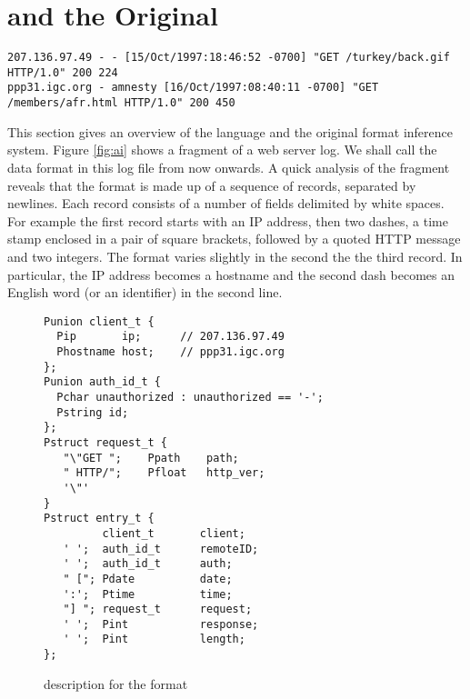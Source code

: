 \section{\pads{} and the Original \learnpads{}} 
\label{sec:review}

\begin{figure*}[th]
{\small \begin{verbatim}
207.136.97.49 - - [15/Oct/1997:18:46:52 -0700] "GET /turkey/back.gif HTTP/1.0" 200 224
ppp31.igc.org - amnesty [16/Oct/1997:08:40:11 -0700] "GET /members/afr.html HTTP/1.0" 200 450
\end{verbatim}                  
}
\caption{A fragment from a web server log in \ai{} format}\label{fig:ai}
\end{figure*}

This section gives an overview of the \pads{} language and the original \learnpads{}
format inference system. Figure \ref{fig:ai} shows a fragment of a web server
log. We shall call the data format 
in this log file \ai{} from now onwards. A quick analysis of the fragment reveals
that the \ai{} format is made up of a sequence of records, separated by newlines.
Each record consists of a number of fields delimited by white spaces. For example
the first record starts with an IP address, then two dashes, a time stamp enclosed in
a pair of square brackets, followed by a quoted HTTP message and two integers.
The format varies slightly in the second the the third record. In particular,
the IP address becomes a hostname and the second dash becomes an English word 
(or an identifier) in the second line. 

\begin{figure}[t]
{\small \begin{verbatim}
Punion client_t {
  Pip       ip;      // 207.136.97.49
  Phostname host;    // ppp31.igc.org 
};
Punion auth_id_t {
  Pchar unauthorized : unauthorized == '-'; 
  Pstring id;                        
};
Pstruct request_t {
   "\"GET ";    Ppath    path;
   " HTTP/";    Pfloat   http_ver; 
   '\"'
}
Pstruct entry_t {
         client_t       client;          
   ' ';  auth_id_t      remoteID;        
   ' ';  auth_id_t      auth;            
   " ["; Pdate          date;   
   ':';  Ptime          time;     
   "] "; request_t      request;         
   ' ';  Pint           response;     
   ' ';  Pint           length; 
};
\end{verbatim}
}
\caption{\padsc{} description for the \ai{} format}
\label{fig:ai.p}
\end{figure}

